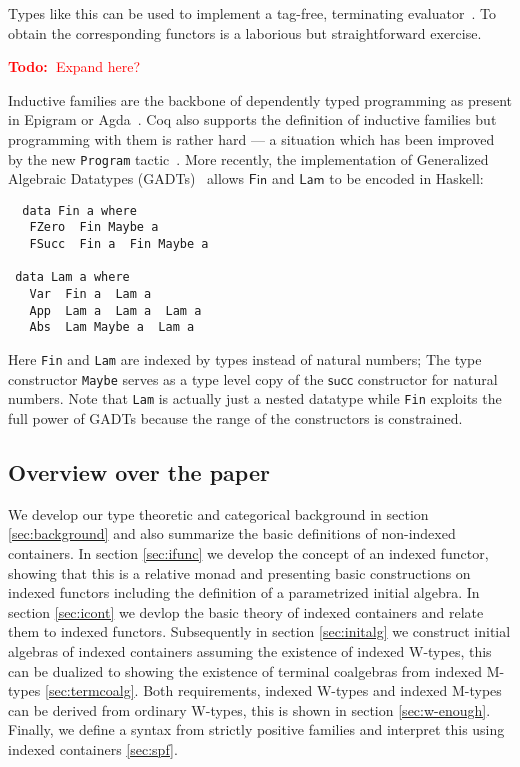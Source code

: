 \documentclass[a4paper]{article}
\newcommand{\todo}[1]{\textcolor{red}{\textbf{Todo:~}#1}}
\newcommand{\Conid}[1]{\mathit{#1}}
\newcommand{\Varid}[1]{\mathit{#1}}
\renewcommand\Varid[1]{\mathord{\textsf{#1}}}
\let\Conid\Varid
\begin{document}
\noindent
Types like this can be used to implement a tag-free, terminating
evaluator~\cite{bsn}. To obtain the corresponding functors
is a laborious but straightforward exercise.

\todo{Expand here?}

\noindent
Inductive families are the backbone of
dependently typed programming as present in Epigram or
Agda~\cite{Agda}. Coq also supports the definition of inductive families
but programming with them is rather hard --- a situation which has been
improved by the new \texttt{Program} tactic~\cite{sozeau}. 
More recently, the implementation of Generalized Algebraic Datatypes 
(GADTs)~\cite{Hinze:GADT} 
allows \ensuremath{\Conid{Fin}} and \ensuremath{\Conid{Lam}} to be encoded in Haskell:
\begin{tabbing}\tt
~data~Fin~a~where~\\
\tt ~~~FZero~~Fin~Maybe~a\\
\tt ~~~FSucc~~Fin~a~~Fin~Maybe~a\\
\tt ~\\
\tt ~data~Lam~a~where~\\
\tt ~~~Var~~Fin~a~~Lam~a\\
\tt ~~~App~~Lam~a~~Lam~a~~Lam~a\\
\tt ~~~Abs~~Lam~Maybe~a~~Lam~a
\end{tabbing}
Here \texttt{Fin} and \texttt{Lam} are indexed by types instead of
natural numbers; The type constructor \texttt{Maybe} serves as a type level
copy of the \ensuremath{\Varid{succ}} constructor for natural numbers.
Note that \texttt{Lam} is actually just a nested datatype 
\cite{alti:csl99} while \texttt{Fin} exploits the full power of
GADTs because the range of the constructors is constrained.

\subsection{Overview over the paper}
\label{sec:overview-over-paper}

We develop our type theoretic and categorical background in section
\ref{sec:background} and also summarize the basic definitions of
non-indexed containers. In section \ref{sec:ifunc} we develop the
concept of an indexed functor, showing that this is a relative monad
and presenting basic constructions on indexed functors including the
definition of a parametrized initial algebra. In section
\ref{sec:icont} we devlop the basic theory of indexed containers and
relate them to indexed functors. Subsequently in section
\ref{sec:initalg} we construct initial algebras of indexed containers
assuming the existence of indexed W-types, this can be dualized to
showing the existence of terminal coalgebras from indexed M-types 
\ref{sec:termcoalg}. Both requirements, indexed W-types and indexed
M-types can be derived from ordinary W-types, this is shown in section
\ref{sec:w-enough}. Finally, we define a syntax from strictly positive
families and interpret this using indexed containers \ref{sec:spf}.
\end{document}
